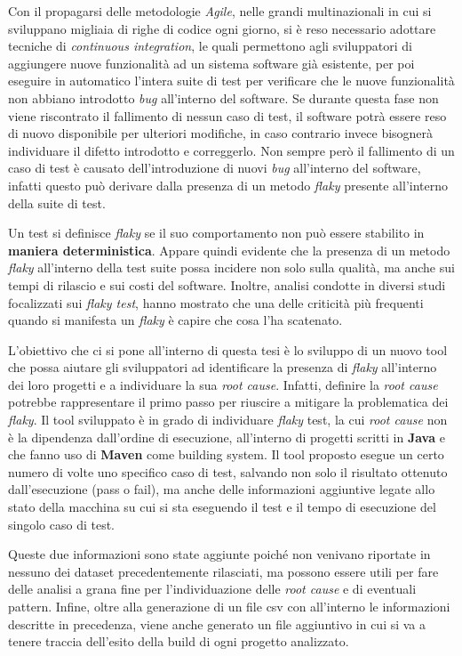 \pagestyle{fancy}
\fancyhf{}
\fancyhead[C]{}
Con il propagarsi delle metodologie \emph{Agile}, nelle grandi multinazionali in cui
si sviluppano migliaia di righe di codice ogni giorno, si è reso necessario adottare tecniche di \emph{continuous integration}, le quali permettono agli sviluppatori di
aggiungere nuove funzionalità ad un sistema software già esistente, per poi eseguire
in automatico l’intera suite di test per verificare che le nuove funzionalità non abbiano introdotto \emph{bug} all’interno del software. Se durante questa fase non viene riscontrato il fallimento di nessun caso di test, il software potrà essere reso di nuovo
disponibile per ulteriori modifiche, in caso contrario invece bisognerà individuare il difetto introdotto e correggerlo. Non sempre però il fallimento di un caso di test è causato dell’introduzione di nuovi \emph{bug} all’interno del software, infatti questo può
derivare dalla presenza di un metodo \emph{flaky} presente all’interno della suite di test.

Un test si definisce \emph{flaky} se il suo comportamento non può essere stabilito in \textbf{maniera deterministica}. Appare quindi evidente che la presenza di un metodo \emph{flaky}
all’interno della test suite possa incidere non solo sulla qualità, ma anche sui tempi di rilascio e sui costi del software. Inoltre, analisi condotte in diversi studi
focalizzati sui \emph{flaky test}, hanno mostrato che una delle criticità più frequenti quando si manifesta un \emph{flaky} è capire che cosa l’ha scatenato.

L’obiettivo che ci si pone all’interno di questa tesi è lo sviluppo di un nuovo tool che possa aiutare gli sviluppatori ad identificare la presenza di \emph{flaky} all’interno
dei loro progetti e a individuare la sua \emph{root cause}. Infatti, definire la \emph{root cause}
potrebbe rappresentare il primo passo per riuscire a mitigare la problematica dei
\emph{flaky}. Il tool sviluppato è in grado di individuare \emph{flaky} test, la cui \emph{root cause} non è
la dipendenza dall’ordine di esecuzione, all’interno di progetti scritti in \textbf{Java} e che fanno uso di \textbf{Maven} come building system. Il tool proposto esegue un certo numero
di volte uno specifico caso di test, salvando non solo il risultato ottenuto dall’esecuzione (pass o fail), ma anche delle informazioni aggiuntive legate allo stato della macchina su cui si sta eseguendo il test e il tempo di esecuzione del singolo caso di test.

Queste due informazioni sono state aggiunte poiché non venivano riportate in nessuno dei dataset precedentemente rilasciati, ma possono essere utili per fare delle analisi a grana fine per l'individuazione delle \emph{root cause} e di eventuali pattern.
Infine, oltre alla generazione di un file csv con all’interno le informazioni descritte in precedenza, viene anche generato un file aggiuntivo in cui si va a tenere traccia dell’esito della build di ogni progetto analizzato.

